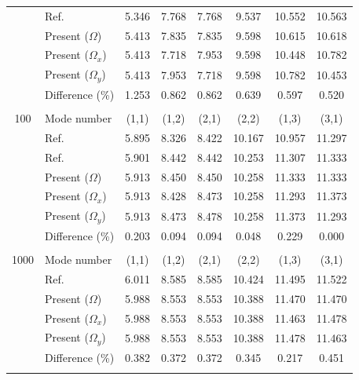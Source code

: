 \documentclass[preprint,12pt]{elsarticle}
\begin{document}
\begin{table}[!htbp]
\begin{tabular}{c l c c c c c c}
		& Ref.\Citealp{zhang2019new}  & 5.346 & 7.768 & 7.768 & 9.537 & 10.552 & 10.563 \\
		& Present ($\Omega$)   &5.413      & 7.835     & 7.835     & 9.598   &  10.615    & 10.618  \\
		& Present ($\Omega_x$)   & 5.413      & 7.718      & 7.953     & 9.598     & 10.448      & 10.782 \\
		& Present ($\Omega_y$)   & 5.413     & 7.953     & 7.718      & 9.598    & 10.782      & 10.453
		\\ 
		&Difference (\%)& 1.253     & 0.862      & 0.862      & 0.639     &  0.597     & 0.520  \\
		\\
		100 & Mode number   &  (1,1) & (1,2) & (2,1) & (2,2) & (1,3) & (3,1) \\
		& Ref.\Citealp{mukhopadhyay1979free} & 5.895& 8.326 &8.422 &10.167 &10.957 &11.297 \\
		& Ref.\Citealp{zhang2019new} & 5.901 & 8.442 & 8.442 & 10.253 & 11.307 & 11.333 \\
		& Present ($\Omega$)   & 5.913     & 8.450     & 8.450     & 10.258     &  11.333    & 11.333  \\
		& Present ($\Omega_x$)   & 5.913     & 8.428      & 8.473    & 10.258     & 11.293      & 11.373 \\
		& Present ($\Omega_y$)   & 5.913    & 8.473     & 8.478    & 10.258     & 11.373     & 11.293
		\\ 
		&Difference (\%)& 0.203     & 0.094      & 0.094      & 0.048     & 0.229     & 0.000 \\
		\\
		1000 & Mode number   & (1,1) & (1,2) & (2,1) & (2,2) & (1,3) & (3,1) \\
		& Ref.\Citealp{zhang2019new} & 6.011 & 8.585 & 8.585 & 10.424 & 11.495 & 11.522 \\
		& Present ($\Omega$)   & 5.988      & 8.553    & 8.553     & 10.388    &  11.470     & 11.470  \\
		& Present ($\Omega_x$)   & 5.988     & 8.553      & 8.553      & 10.388      & 11.463      & 11.478 \\
		& Present ($\Omega_y$)   & 5.988     & 8.553     & 8.553    & 10.388      & 11.478       & 11.463
		\\ 
		&Difference (\%)& 0.382    & 0.372      & 0.372      & 0.345     &  0.217     & 0.451
		 \\
		\\
		\bottomrule
	\end{tabular}
	\label{tab:rot1}
\end{table}
\end{document}
